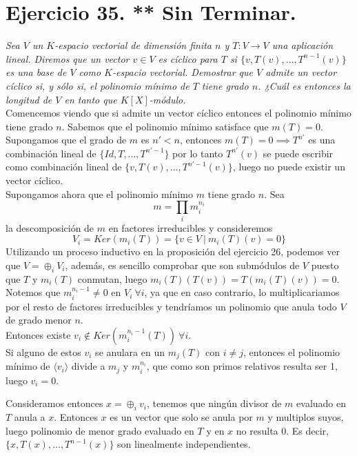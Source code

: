 \section{Ejercicio 35. ** Sin Terminar.} \textit{Sea \(V\) un \(K\)-espacio
  vectorial de dimensión finita \(n\) y \(T:V \to V\) una
  aplicación lineal. Diremos que un vector \(v \in V\) es cíclico para
  \(T\) si \(\{v, T(v), \dots, T^{n-1}(v)\}\) es una base de \(V\)
  como \(K\)-espacio vectorial. Demostrar que \(V\) admite un vector cíclico si,
  y sólo si, el polinomio mínimo de \(T\) tiene grado \(n\). ¿Cuál es entonces
  la longitud de \(V\) en tanto que \(K[X]\)-módulo.}\\


Comencemos viendo que si admite un vector cíclico entonces el polinomio mínimo
tiene grado \(n\). Sabemos que el polinomio mínimo satisface que \(m(T)=0\). Supongamos que el
grado de \(m\) es \(n' < n\),  entonces \(m(T)=0 \implies T^{n'}\) es una
combinación lineal de \(\{Id,T,\dots,T^{n'-1}\}\) por lo tanto \(T^{n'}(v)\) se
puede escribir como combinación lineal de \(\{v,T(v),\dots,T^{n'-1}(v)\}\),
luego no puede existir un vector cíclico.\\

Supongamos ahora que el polinomio mínimo \(m\) tiene grado \(n\). Sea
\[
  m = \prod_i m_i^{n_i}
\]
la descomposición de \(m\) en factores irreducibles y consideremos
\[
  V_i = Ker(m_i(T)) = \{v \in V \ | \ m_i(T)(v) = 0\}
\]
Utilizando un proceso inductivo en la proposición del ejercicio 26, podemos ver
que \(V = \oplus_i V_i\), además, es sencillo comprobar que son submódulos de \(V\) puesto que \(T\) y \(m_i(T)\)
conmutan, luego \(m_i(T)(T(v)) = T(m_i(T)(v)) = 0\).
Notemos que \(m_i^{n_i - 1} \neq 0\) en \(V_i \ \forall i\), ya que en caso
contrario, lo multiplicariamos por el resto de factores irreducibles y
tendríamos un polinomio que anula todo \(V\) de grado menor \(n\).\\

Entonces existe \(v_i \not \in Ker(m_i^{n_i-1}(T)) \ \forall i\).\\

Si alguno de estos \(v_i\) se anulara en un \(m_j(T)\) con \(i \neq j\),
entonces el polinomio mínimo de \(\langle v_i \rangle\) divide a \(m_j\) y
\(m_i^{n_i}\), que como son primos relativos resulta ser 1, luego \(v_i = 0\).

Consideramos entonces \(x = \oplus_i v_i\), tenemos que ningún divisor de \(m\)
evaluado en \(T\) anula a \(x\). Entonces \(x\) es un vector que solo se anula
por \(m\) y multiplos suyos, luego polinomio de menor grado evaluado en \(T\) y
en \(x\) no resulta 0. Es decir, \(\{x, T(x), \dots, T^{n-1}(x)\}\)
son linealmente independientes.
